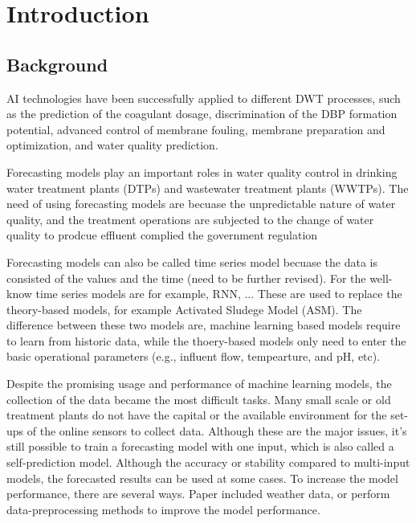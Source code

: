 \chapter{Introduction}

\section{Background}

AI technologies have been successfully applied to different DWT processes, such as the prediction of the coagulant 
dosage, discrimination of the DBP formation potential, advanced control of membrane fouling, membrane preparation 
and optimization, and water quality prediction. \cite{liRecentAdvancesArtificial2021}

Forecasting models play an important roles in water quality control in drinking water treatment plants (DTPs) 
and wastewater treatment plants (WWTPs). The need of using forecasting models are becuase the unpredictable 
nature of water quality, and the treatment operations are subjected to the change of water quality to prodcue
effluent complied the government regulation \cite{chenAssessingWastewaterReclamation2003}

Forecasting models can also be called time series model becuase the data is consisted of the values and the 
time (need to be further revised). For the well-know time series models are for example, RNN, ... These are 
used to replace the theory-based models, for example Activated Sludege Model (ASM). The difference between 
these two models are, machine learning based models require to learn from historic data, while the thoery-based
models only need to enter the basic operational parameters (e.g., influent flow, tempearture, and pH, etc).

Despite the promising usage and performance of machine learning models, the collection of the data became
the most difficult tasks. Many small scale or old treatment plants do not have the capital or the available
environment for the set-ups of the online sensors to collect data.
Although these are the major issues, it's still possible to train a forecasting model with one input, which 
is also called a self-prediction model. Although the accuracy or stability compared to multi-input models, 
the forecasted results can be used at some cases. To increase the model performance, there are several ways.
Paper included weather data, or perform data-preprocessing methods to improve the model performance.

